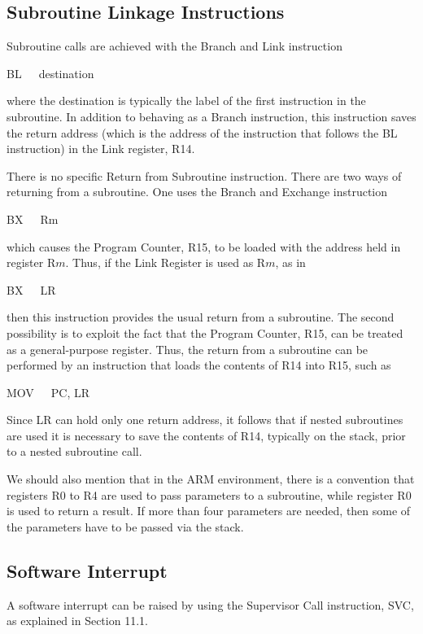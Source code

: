 \documentclass[11pt, twoside, pdftex]{article}
\begin{document}
\subsection{Subroutine Linkage Instructions}

Subroutine calls are achieved with the Branch and Link
instruction
\begin{center}
BL~~~destination
\end{center}
\noindent
where the destination is typically the label of the first
instruction in the subroutine.
In addition to behaving as a Branch instruction,
this instruction saves the return address (which is the address
of the instruction that follows the BL instruction) in the Link
register, R14.

There is no specific Return from Subroutine instruction.
There are two ways of returning from a subroutine. 
One uses the Branch and Exchange instruction
\begin{center}
BX~~~Rm
\end{center}
\noindent
which causes the Program Counter, R15, to be loaded with the
address held in register R$m$. Thus, if the Link Register is used
as R$m$, as in
\begin{center}
BX~~~LR
\end{center}
\noindent
then this instruction provides the usual return from a
subroutine. The second possibility is to exploit the fact that 
the Program Counter, R15, can be treated as a general-purpose
register. Thus, the return from a subroutine can be performed by
an instruction that loads the contents of R14 into R15, such as
\begin{center}
MOV~~~PC, LR
\end{center}
\noindent
Since LR can hold only one return address, it follows that
if nested subroutines are used it is necessary to save the contents of R14, typically on the stack, prior to a nested subroutine call.

We should also mention that in the ARM environment, there is a
convention that registers R0 to R4 are used to pass parameters
to a subroutine, while register R0 is used to return a result.
If more than four parameters are needed, then some of the
parameters have to be passed via the stack.

\subsection{Software Interrupt}

A software interrupt can be raised by using the Supervisor
Call instruction, SVC, as explained in Section 11.1.
\end{document}
